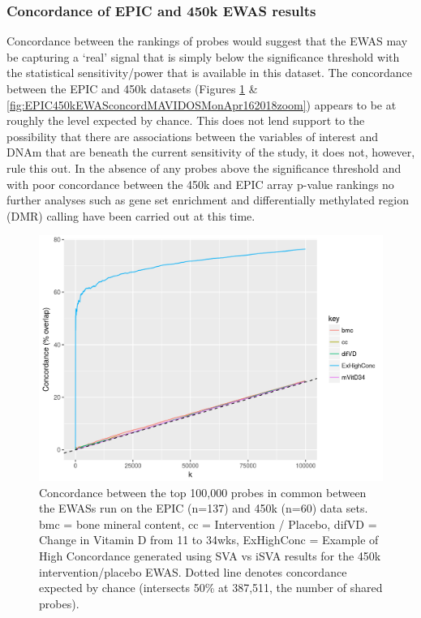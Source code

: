 \documentclass[
]{book}
\begin{document}
\hypertarget{concordance-of-epic-and-450k-ewas-results-1}{%
\subsubsection{Concordance of EPIC and 450k EWAS results}\label{concordance-of-epic-and-450k-ewas-results-1}}

Concordance between the rankings of probes would suggest that the EWAS may be capturing a `real' signal that is simply below the significance threshold with the statistical sensitivity/power that is available in this dataset.
The concordance between the EPIC and 450k datasets (Figures \ref{fig:EPIC450kEWASconcordMAVIDOSMonApr162018} \& \ref{fig:EPIC450kEWASconcordMAVIDOSMonApr162018zoom}) appears to be at roughly the level expected by chance.
This does not lend support to the possibility that there are associations between the variables of interest and DNAm that are beneath the current sensitivity of the study, it does not, however, rule this out.
In the absence of any probes above the significance threshold and with poor concordance between the 450k and EPIC array p-value rankings no further analyses such as gene set enrichment and differentially methylated region (DMR) calling have been carried out at this time.

\begin{figure}

{\centering \includegraphics[width=0.8\linewidth]{figs/EPIC450kEWASconcordMAVIDOSMonApr162018} 

}

\caption{Concordance between the top 100,000 probes in common between the EWASs run on the EPIC (n=137) and 450k (n=60) data sets. bmc = bone mineral content, cc = Intervention / Placebo, difVD = Change in Vitamin D from 11 to 34wks, ExHighConc = Example of High Concordance generated using SVA vs iSVA results for the 450k intervention/placebo EWAS. Dotted line denotes concordance expected by chance (intersects 50\% at 387,511, the number of shared probes).}\label{fig:EPIC450kEWASconcordMAVIDOSMonApr162018}
\end{figure}
\end{document}
